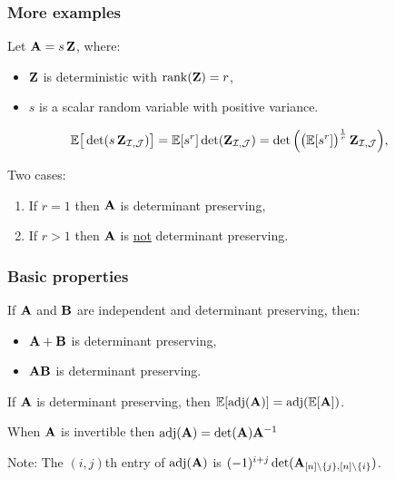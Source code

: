 \documentclass[handout]{beamer}
\begin{document}
\begin{frame}
  \frametitle{More examples}
  Let $\mathbf A = s\,\mathbf Z$, where:
  \begin{itemize}
  \item $\mathbf Z$ is deterministic with $\mathrm{rank}(\mathbf Z) = r$,
  \item $s$ is a scalar random variable with positive variance.
  \end{itemize}\vspace{1mm}
\pause
  \begin{align*}
  \mathbb E\big[\det(s\,\mathbf Z_{\mathcal I,\mathcal{J}})\big] &= \mathbb E[s^r]\det(\mathbf Z_{\mathcal I,\mathcal{J}})
=\det\Big(\big(\mathbb E[s^r]\big)^{\frac1r}\,\mathbf Z_{\mathcal I,\mathcal{J}}\Big),
  \end{align*}
  \pause
  
Two cases:
\begin{enumerate}
\item If $r=1$ then $\mathbf A$ is determinant preserving,
  \item If $r>1$ then $\mathbf A$ is \underline{not}
    determinant preserving.
    \end{enumerate}
\end{frame}

\begin{frame}
  \frametitle{Basic properties}
  \begin{lemma}[Closure]
  If $\mathbf A$ and $\mathbf B$ are independent and determinant preserving, then:
  \begin{itemize}
  \item $\mathbf A+\mathbf B$ is determinant preserving,
  \item $\mathbf A\mathbf B$ is determinant preserving.
    \end{itemize}
  \end{lemma}
  \pause\vspace{5mm}
  
  \begin{lemma}[Adjugate]
    If $\mathbf A$ is determinant preserving, then  $\mathbb E[\operatorname{\textnormal{adj}}(\mathbf A)]=\operatorname{\textnormal{adj}}(\mathbb E[\mathbf A])$.
  \end{lemma}
When $\mathbf A$ is invertible then $\operatorname{\textnormal{adj}}(\mathbf A) = \det(\mathbf A)\mathbf A^{-1}$\vspace{5mm}

\footnotesize{Note: The $(i,j)$th entry of $\operatorname{\textnormal{adj}}(\mathbf A)$ is
$(-1)^{i+j}\det(\mathbf A_{[n]\backslash\{j\},[n]\backslash\{i\}})$.}
\end{frame}
\end{document}
